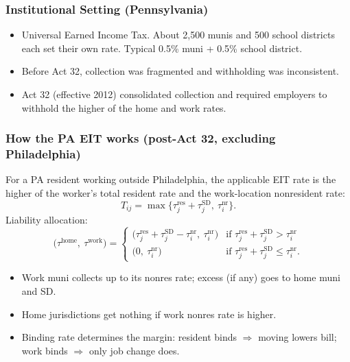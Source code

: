 \documentclass[xcolor = x11names, compress, aspectratio = 169]{beamer}
\renewcommand{\(}{\begin{columns}}
\renewcommand{\)}{\end{columns}}
\newcommand{\<}[1]{\begin{column}{#1}}
\renewcommand{\>}{\end{column}}
\begin{document}
\begin{frame}
\frametitle{Institutional Setting (Pennsylvania)}
    \begin{itemize}\setlength{\itemsep}{0.25cm}
        \item Universal Earned Income Tax. About 2{,}500 munis and 500
        school districts each set their own rate. Typical 0.5\% muni
        + 0.5\% school district.
        \item Before Act 32, collection was fragmented and withholding
        was inconsistent.
        \item Act 32 (effective 2012) consolidated collection and
        required employers to withhold the higher of the home and work
        rates.
    \end{itemize}
\end{frame}

\begin{frame}
\frametitle{How the PA EIT works (post-Act 32, excluding Philadelphia)}
    \footnotesize
    For a PA resident working outside Philadelphia, the applicable EIT rate is
    the higher of the worker's total resident rate and the work-location nonresident rate:
    \[
        T_{ij} = \max\{\tau^{\text{res}}_j + \tau^{\text{SD}}_j,\ \tau^{\text{nr}}_i\}.
    \]
    Liability allocation:
    \[
        \bigl(\tau^{\text{home}},\ \tau^{\text{work}}\bigr) =
        \begin{cases}
            \bigl(\tau^{\text{res}}_j + \tau^{\text{SD}}_j - \tau^{\text{nr}}_i,\ \tau^{\text{nr}}_i\bigr)
              & \text{if } \tau^{\text{res}}_j + \tau^{\text{SD}}_j > \tau^{\text{nr}}_i \\[2pt]
            \bigl(0,\ \tau^{\text{nr}}_i\bigr)
              & \text{if } \tau^{\text{res}}_j + \tau^{\text{SD}}_j \leq \tau^{\text{nr}}_i .
        \end{cases}
    \]
    \begin{itemize}\setlength{\itemsep}{0.05cm}
        \item Work muni collects up to its nonres rate; excess (if any) goes to home muni and SD.
        \item Home jurisdictions get nothing if work nonres rate is higher.
        \item Binding rate determines the margin: resident binds $\Rightarrow$
        moving lowers bill; work binds $\Rightarrow$ only job change does.
    \end{itemize}
\end{frame}
\end{document}
